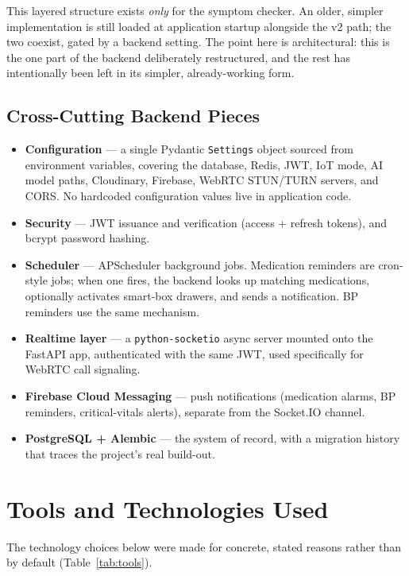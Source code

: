 \documentclass[12pt,a4paper]{report}
\begin{document}
This layered structure exists \emph{only} for the symptom checker. An older,
simpler implementation is still loaded at application startup alongside the v2
path; the two coexist, gated by a backend setting. The point here is
architectural: this is the one part of the backend deliberately restructured,
and the rest has intentionally been left in its simpler, already-working form.

\subsection{Cross-Cutting Backend Pieces}

\begin{itemize}[leftmargin=1.4em]
  \item \textbf{Configuration} --- a single Pydantic \texttt{Settings} object
  sourced from environment variables, covering the database, Redis, JWT, IoT
  mode, AI model paths, Cloudinary, Firebase, WebRTC STUN/TURN servers, and
  CORS. No hardcoded configuration values live in application code.
  \item \textbf{Security} --- JWT issuance and verification (access + refresh
  tokens), and bcrypt password hashing.
  \item \textbf{Scheduler} --- APScheduler background jobs. Medication reminders
  are cron-style jobs; when one fires, the backend looks up matching
  medications, optionally activates smart-box drawers, and sends a
  notification. BP reminders use the same mechanism.
  \item \textbf{Realtime layer} --- a \texttt{python-socketio} async server
  mounted onto the FastAPI app, authenticated with the same JWT, used
  specifically for WebRTC call signaling.
  \item \textbf{Firebase Cloud Messaging} --- push notifications (medication
  alarms, BP reminders, critical-vitals alerts), separate from the Socket.IO
  channel.
  \item \textbf{PostgreSQL + Alembic} --- the system of record, with a migration
  history that traces the project's real build-out.
\end{itemize}

\section{Tools and Technologies Used}

The technology choices below were made for concrete, stated reasons rather than
by default (Table~\ref{tab:tools}).
\end{document}
